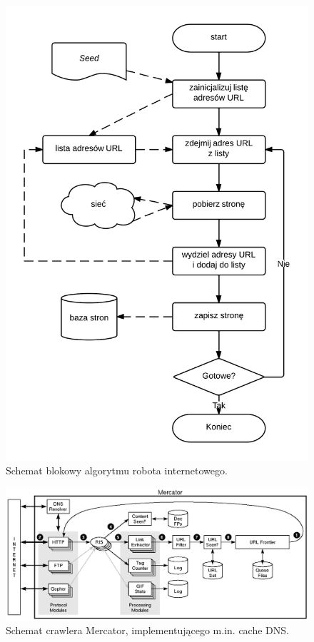 \begin{figure}[!h]
    \centering
    \includegraphics[scale=0.3]{spider_algorithm}
    \caption{Schemat blokowy algorytmu robota internetowego.}
\end{figure}


\begin{figure}
    \centering
    \includegraphics[scale=0.3]{mercator}
    \caption{Schemat crawlera Mercator, implementującego m.in. cache DNS.}
\end{figure}


